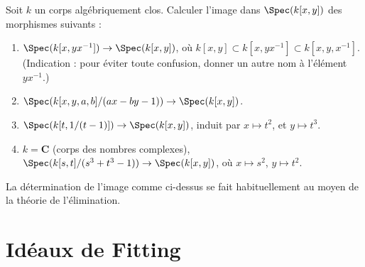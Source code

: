 \begin{exercise}
\label{exercise-images}
Soit $k$ un corps algébriquement clos. Calculer l'image dans
$\Spec(k[x, y])$
des morphismes suivants :
\begin{enumerate}
\item $\Spec(k[x, yx^{-1}]) \to \Spec(k[x, y])$, où
$k[x, y] \subset k[x, yx^{-1}] \subset k[x, y, x^{-1}]$.
(Indication : pour éviter toute confusion, donner un autre nom à l'élément $yx^{-1}$.)
\item $\Spec(k[x, y, a, b]/(ax-by-1))\to \Spec(k[x, y])$.
\item $\Spec(k[t, 1/(t-1)]) \to \Spec(k[x, y])$, induit par $x
\mapsto t^2$,
et $y \mapsto t^3$.
\item $k = {\mathbf C}$ (corps des nombres complexes),
$\Spec(k[s, t]/(s^3 + t^3-1)) \to \Spec(k[x, y])$, où
$x\mapsto s^2$, $y \mapsto t^2$.
\end{enumerate}
\end{exercise}

\begin{remark}
\label{remark-elimination-theory}
La détermination de l'image comme ci-dessus se fait habituellement au moyen de la théorie de l'élimination.
\end{remark}




\section{Idéaux de Fitting}
\label{section-fitting-ideals}

